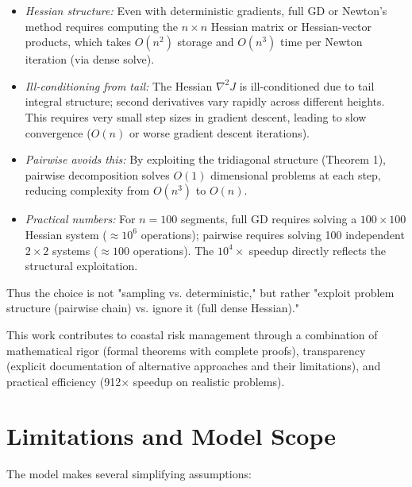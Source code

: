 \documentclass[12pt]{article}
\theoremstyle{definition}
\begin{document}
\begin{itemize}
    \item \emph{Hessian structure:} Even with deterministic gradients, full GD or Newton's method requires computing the $n \times n$ Hessian matrix or Hessian-vector products, which takes $O(n^2)$ storage and $O(n^3)$ time per Newton iteration (via dense solve).

    \item \emph{Ill-conditioning from tail:} The Hessian $\nabla^2 J$ is ill-conditioned due to tail integral structure; second derivatives vary rapidly across different heights. This requires very small step sizes in gradient descent, leading to slow convergence ($O(n)$ or worse gradient descent iterations).

    \item \emph{Pairwise avoids this:} By exploiting the tridiagonal structure (Theorem 1), pairwise decomposition solves $O(1)$ dimensional problems at each step, reducing complexity from $O(n^3)$ to $O(n)$.

    \item \emph{Practical numbers:} For $n=100$ segments, full GD requires solving a $100 \times 100$ Hessian system ($\approx 10^6$ operations); pairwise requires solving 100 independent $2 \times 2$ systems ($\approx 100$ operations). The $10^4 \times$ speedup directly reflects the structural exploitation.
\end{itemize}

Thus the choice is not "sampling vs. deterministic," but rather "exploit problem structure (pairwise chain) vs. ignore it (full dense Hessian)."

This work contributes to coastal risk management through a combination of mathematical rigor (formal theorems with complete proofs), transparency (explicit documentation of alternative approaches and their limitations), and practical efficiency (912× speedup on realistic problems).

\section*{Limitations and Model Scope}

The model makes several simplifying assumptions:
\end{document}
